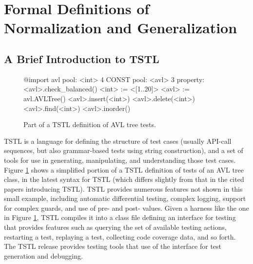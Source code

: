 \section{Formal Definitions of Normalization and Generalization}

\subsection{A Brief Introduction to TSTL}

\begin{figure}
{\scriptsize
\begin{code}
@import avl
\vspace{0.05in}
pool: <int> 4 CONST
pool: <avl> 3
\vspace{0.05in}
property: <avl>.check\_balanced()
\vspace{0.05in}
<int> := <[1..20]>
<avl> := avl.AVLTree()
\vspace{0.05in}
<avl>.insert(<int>)
<avl>.delete(<int>)
<avl>.find(<int>)
<avl>.inorder()
\end{code}
}
\caption{Part of a TSTL definition of AVL tree tests.}
\label{fig:example}
\end{figure}


TSTL \cite{NFM15,ISSTA15} is a language for defining the structure of
test cases (usually API-call sequences, but also grammar-based tests using
string construction), and a set of tools for use in generating,
manipulating, and understanding those test cases.  Figure
\ref{fig:example} shows a simplified portion of a TSTL definition of
tests of an AVL tree class, in the latest syntax for TSTL (which
differs slightly from that in the cited papers introducing TSTL).
TSTL provides numerous features not shown in this small example,
including automatic differential testing, complex logging, support for
complex guards, and use of pre- and post- values.  Given a harness
like the one in Figure \ref{fig:example}, TSTL compiles it into a
class file defining an interface for testing that provides features
such as querying the set of available testing actions, restarting a
test, replaying a test, collecting code coverage data, and so forth.
The TSTL release \cite{tstl} provides testing tools that use of the
interface for test generation and debugging.

